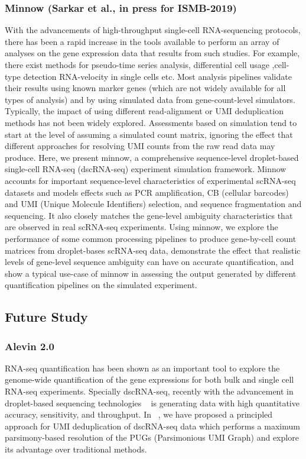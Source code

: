 \subsubsection{Minnow (Sarkar et al., in press for ISMB-2019)}
With the advancements of high-throughput single-cell RNA-sequencing protocols, there 
has been a rapid increase in the tools available to perform an array of analyses on the 
gene expression data that results from such studies.  For example, there exist methods 
for pseudo-time series analysis, differential cell usage ,cell-type detection RNA-velocity 
in single cells etc. Most analysis pipelines validate their results using known marker 
genes (which are not widely available for all types of analysis) and by using simulated 
data from gene-count-level simulators. Typically, the impact of using different 
read-alignment or UMI deduplication methods has not been widely explored. Assessments 
based on simulation tend to start at the level of assuming a simulated count matrix, 
ignoring the effect that different approaches for resolving UMI counts from the raw read 
data may produce. Here, we present minnow, a comprehensive sequence-level droplet-based 
single-cell RNA-seq (dscRNA-seq) experiment simulation framework.  Minnow accounts for 
important sequence-level characteristics of experimental scRNA-seq datasets and models 
effects such as PCR amplification,  CB (cellular barcodes) and UMI (Unique Molecule 
Identifiers) selection, and sequence fragmentation and sequencing. It also closely matches 
the gene-level ambiguity characteristics that are observed in real scRNA-seq experiments.  
Using minnow, we explore the performance of some common processing pipelines to produce 
gene-by-cell count matrices from droplet-bases scRNA-seq data, demonstrate the effect that 
realistic levels of gene-level sequence ambiguity can have on accurate quantification, 
and show a typical use-case of minnow in assessing the output generated by different 
quantification pipelines on the simulated experiment.

\subsection{Future Study}
\subsubsection{Alevin 2.0}
RNA-seq quantification has been shown as an important tool to explore the genome-wide
quantification of the gene expressions for both bulk and single cell RNA-seq experiments. 
Specially dscRNA-seq, recently with the advancement in droplet-based sequencing technologies 
~\citet{dropseq, indrop, tenx} is generating data with high quantitative accuracy, 
sensitivity, and throughput. In ~, we have proposed a
principled approach for UMI deduplication of dscRNA-seq data which performs a maximum 
parsimony-based resolution of the PUGs (Parsimonious UMI Graph) and explore its advantage over 
traditional methods. 

